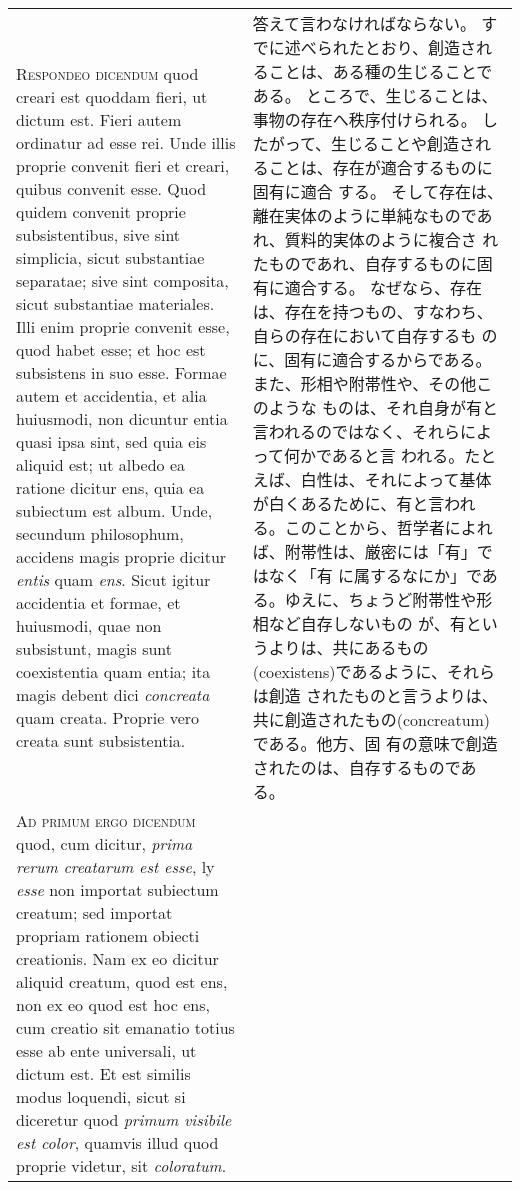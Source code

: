\documentclass[10pt]{jsarticle} %
\begin{document}
\begin{longtable}{p{21em}p{21em}}
\\


{\scshape Respondeo dicendum} quod creari est quoddam fieri, ut dictum
est. Fieri autem ordinatur ad esse rei. Unde illis proprie convenit
fieri et creari, quibus convenit esse. Quod quidem convenit proprie
subsistentibus, sive sint simplicia, sicut substantiae separatae; sive
sint composita, sicut substantiae materiales. Illi enim proprie convenit
esse, quod habet esse; et hoc est subsistens in suo esse. Formae autem
et accidentia, et alia huiusmodi, non dicuntur entia quasi ipsa sint,
sed quia eis aliquid est; ut albedo ea ratione dicitur ens, quia ea
subiectum est album. Unde, secundum philosophum, accidens magis proprie
dicitur {\itshape entis} quam {\itshape ens}. Sicut igitur accidentia et
formae, et huiusmodi, quae non subsistunt, magis sunt coexistentia quam
entia; ita magis debent dici {\itshape concreata} quam creata. Proprie
vero creata sunt subsistentia.

&

答えて言わなければならない。
すでに述べられたとおり、創造されることは、ある種の生じることである。
ところで、生じることは、事物の存在へ秩序付けられる。
したがって、生じることや創造されることは、存在が適合するものに固有に適合
 する。
そして存在は、離在実体のように単純なものであれ、質料的実体のように複合さ
 れたものであれ、自存するものに固有に適合する。
なぜなら、存在は、存在を持つもの、すなわち、自らの存在において自存するも
 のに、固有に適合するからである。また、形相や附帯性や、その他このような
 ものは、それ自身が有と言われるのではなく、それらによって何かであると言
 われる。たとえば、白性は、それによって基体が白くあるために、有と言われ
 る。このことから、哲学者によれば、附帯性は、厳密には「有」ではなく「有
 に属するなにか」である。ゆえに、ちょうど附帯性や形相など自存しないもの
 が、有というよりは、共にあるもの(coexistens)であるように、それらは創造
 されたものと言うよりは、共に創造されたもの(concreatum)である。他方、固
 有の意味で創造されたのは、自存するものである。

\\


{\scshape Ad primum ergo dicendum} quod, cum dicitur, {\itshape prima
rerum creatarum est esse}, ly {\itshape esse} non importat subiectum
creatum; sed importat propriam rationem obiecti creationis. Nam ex eo
dicitur aliquid creatum, quod est ens, non ex eo quod est hoc ens, cum
creatio sit emanatio totius esse ab ente universali, ut dictum est. Et
est similis modus loquendi, sicut si diceretur quod {\itshape primum
visibile est color}, quamvis illud quod proprie videtur, sit {\itshape
coloratum}.


\end{longtable}
\end{document}
